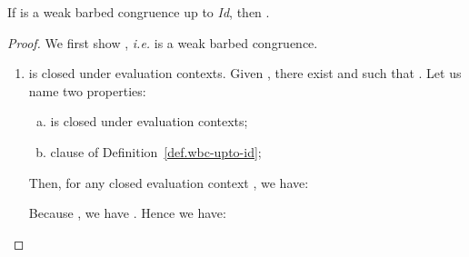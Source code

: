 \documentclass{LMCS}
\makeatletter
\newcommand{\ie}{\emph{i.e.}\@\xspace}
\newcommand{\Id}{\emph{Id}\@\xspace}
\renewcommand{\_}{\mathord{\rule[-.25ex]{1ex}{.15ex}}}
\makeatother
\begin{document}
\begin{lem}\label{lemma.wbc-upto-id}
  If  is a weak barbed congruence up to \Id, then
  .
\end{lem}
\begin{proof}
  We first show   , \ie  is
  a weak barbed congruence.
  \begin{enumerate}[(1)]
  \item  is closed under evaluation contexts. Given
    , there exist  and  such that . Let us name two properties:
    \begin{enumerate}[(a)]
    \item  is closed under evaluation contexts;
    \item clause  of Definition~\ref{def.wbc-upto-id};
    \end{enumerate}
    Then, for any closed evaluation context , we have:
    
    Because   , we have 
     . Hence we have:
    

\end{enumerate}
\end{proof}
\end{document}
